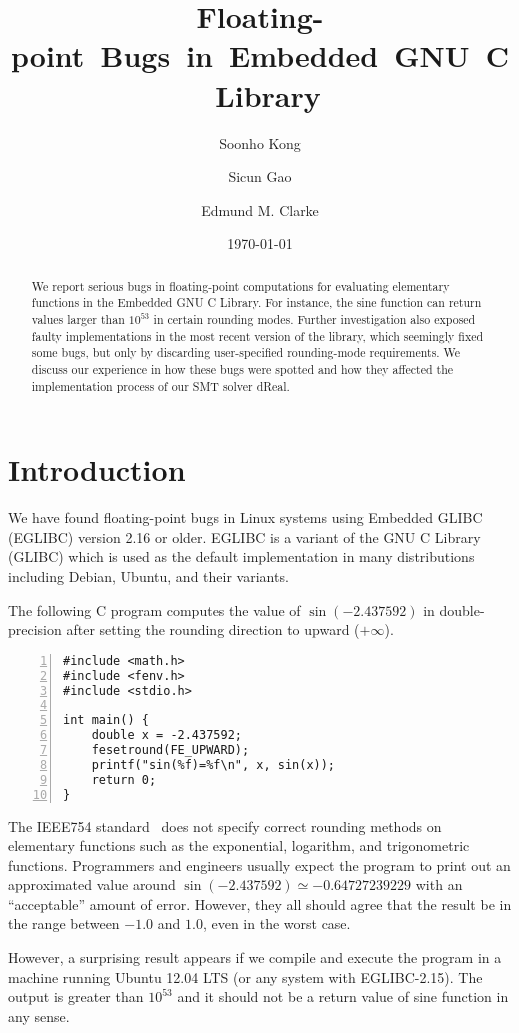 \documentclass{llncs}
\title{\mbox{Floating-point Bugs in Embedded GNU C Library}}
\author{Soonho Kong \and Sicun Gao \and Edmund M. Clarke}
\institute{Carnegie Mellon University, Pittsburgh, PA 15213}
\date{\today}
\begin{document}
\maketitle

\begin{abstract}
We report serious bugs in floating-point computations for evaluating elementary
functions in the Embedded GNU C Library. For instance, the sine
function can return values larger than $10^{53}$ in certain rounding
modes. Further investigation also exposed faulty implementations in
the most recent version of the library, which seemingly fixed some
bugs, but only by discarding user-specified rounding-mode
requirements. We discuss our experience in how these bugs were
spotted and how they affected the implementation process of our
SMT solver dReal.
\end{abstract}

\section{Introduction}\label{sec:intro}

We have found floating-point bugs in Linux systems using Embedded
GLIBC (EGLIBC) version 2.16 or older. EGLIBC is a variant of the GNU C
Library (GLIBC) which is used as the default implementation in many
distributions including Debian, Ubuntu, and their variants.

The following C program computes the value of $\sin(-2.437592)$ in
double-precision after setting the rounding direction to upward
($+\infty$).

\begin{Verbatim}[numbers=left, frame=single, fontsize=\relsize{-1}]
#include <math.h>
#include <fenv.h>
#include <stdio.h>

int main() {
    double x = -2.437592;
    fesetround(FE_UPWARD);
    printf("sin(%f)=%f\n", x, sin(x));
    return 0;
}
\end{Verbatim}

The IEEE754 standard~\cite{IEEE:1985:AIS} does not specify correct
rounding methods on elementary functions such as the exponential,
logarithm, and trigonometric functions. Programmers and engineers
usually expect the program to print out an approximated value around
$\sin(-2.437592) \simeq -0.64727239229$ with an ``acceptable'' amount
of error. However, they all should agree that the result be in the
range between $-1.0$ and $1.0$, even in the worst case.

However, a surprising result appears if we compile and execute the
program in a machine running Ubuntu 12.04 LTS (or any system with
EGLIBC-2.15). The output is greater than $10^{53}$ and it should not be
a return value of sine function in any sense.
\end{document}
